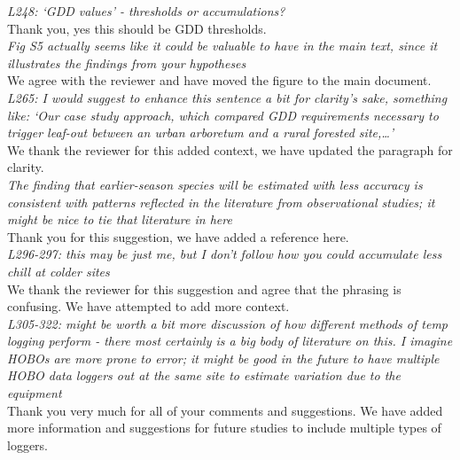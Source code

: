 \documentclass[11pt,a4paper]{article}\usepackage[]{graphicx}\usepackage[]{color}
\begin{document}
\textit{L248: `GDD values' - thresholds or accumulations?} \\

Thank you, yes this should be GDD thresholds. \\

\textit{Fig S5 actually seems like it could be valuable to have in the main text, since it illustrates the findings from your hypotheses} \\

We agree with the reviewer and have moved the figure to the main document. \\

\textit{L265: I would suggest to enhance this sentence a bit for clarity's sake, something like: `Our case study approach, which compared GDD requirements necessary to trigger leaf-out between an urban arboretum and a rural forested site,…'} \\

We thank the reviewer for this added context, we have updated the paragraph for clarity. \\

\textit{The finding that earlier-season species will be estimated with less accuracy is consistent with patterns reflected in the literature from observational studies; it might be nice to tie that literature in here} \\

Thank you for this suggestion, we have added a reference here. \\

\textit{L296-297: this may be just me, but I don't follow how you could accumulate less chill at colder sites} \\

We thank the reviewer for this suggestion and agree that the phrasing is confusing. We have attempted to add more context. \\

\textit{L305-322: might be worth a bit more discussion of how different methods of temp logging perform - there most certainly is a big body of literature on this. I imagine HOBOs are more prone to error; it might be good in the future to have multiple HOBO data loggers out at the same site to estimate variation due to the equipment} \\

Thank you very much for all of your comments and suggestions. We have added more information and suggestions for future studies to include multiple types of loggers. \\
\end{document}
